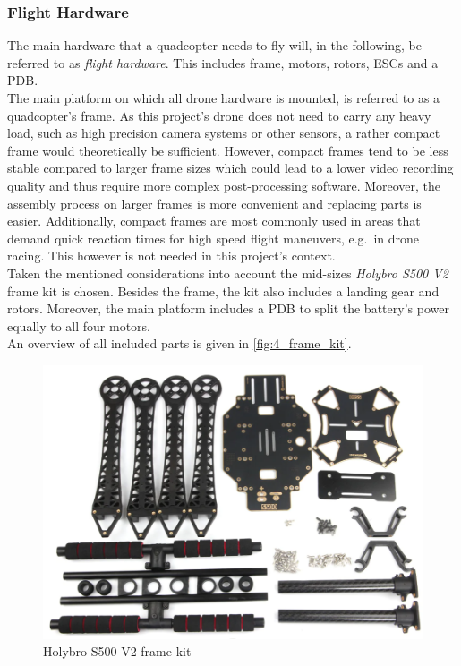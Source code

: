 \subsubsection{Flight Hardware}\label{subsec:4_filght_hardware}
The main hardware that a quadcopter needs to fly will, in the following, be
referred to as \textit{flight hardware}.
This includes frame, motors, rotors, \acp{ESC} and a \ac{PDB}.\\
The main platform on which all drone hardware is mounted, is referred to as
a quadcopter's frame.
As this project's drone does not need to carry any heavy load, such as high 
precision camera systems or other sensors, a rather compact frame would 
theoretically be sufficient.
However, compact frames tend to be less stable compared to larger frame sizes 
which could lead to a lower video recording quality and thus require more 
complex post-processing software.
Moreover, the assembly process on larger frames is more convenient and 
replacing parts is easier.
Additionally, compact frames are most commonly used in areas that demand quick
reaction times for high speed flight maneuvers, e.g.~in drone racing.
This however is not needed in this project's context.\\
Taken the mentioned considerations into account the mid-sizes \textit{Holybro 
S500 V2} frame kit is chosen.
Besides the frame, the kit also includes a landing gear and rotors.
Moreover, the main platform includes a \ac{PDB} to split the battery's power 
equally to all four motors.\\
An overview of all included parts is given in \autoref{fig:4_frame_kit}.
\begin{figure}[!h]
    \centering
    \includegraphics[scale=0.6]{frame-kit.png}
    \caption[Frame kit]{Holybro S500 V2 frame kit}
    \label{fig:4_frame_kit}
\end{figure}

